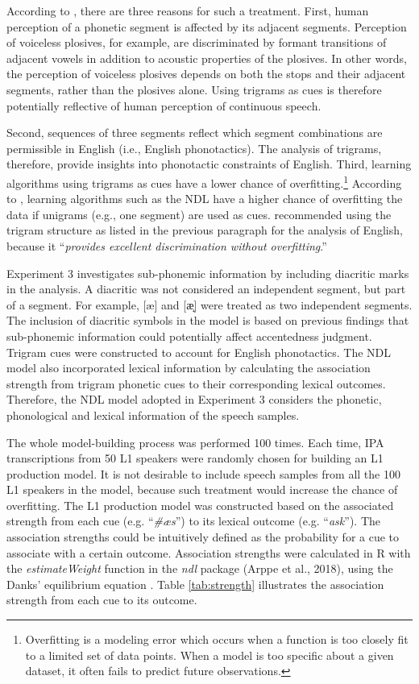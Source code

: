 According to \citet{Baayen_2016}, there are three reasons for such a treatment. First, human perception of a phonetic segment is affected by its adjacent segments. Perception of voiceless plosives, for example, are discriminated by formant transitions of adjacent vowels in addition to acoustic properties of the plosives. In other words, the perception of voiceless plosives depends on both the stops and their adjacent segments, rather than the plosives alone. Using trigrams as cues is therefore potentially reflective of human perception of continuous speech. 

Second, sequences of three segments reflect which segment combinations are permissible in English (i.e., English phonotactics). The analysis of trigrams, therefore, provide insights into phonotactic constraints of English. Third, learning algorithms using trigrams as cues have a lower chance of overfitting.\footnote{Overfitting is a modeling error which occurs when a function is too closely fit to a limited set of data points. When a model is too specific about a given dataset, it often fails to predict future observations.} According to \citet{Baayen_2016}, learning algorithms such as the NDL have a higher chance of overfitting the data if unigrams (e.g., one segment) are used as cues. \citet{Baayen_2016} recommended using the trigram structure as listed in the previous paragraph for the analysis of English, because it “\textit{provides excellent discrimination without overfitting}.” 

Experiment 3 investigates sub-phonemic information by including diacritic marks in the analysis.  A diacritic was not considered an independent segment, but part of a segment. For example, [æ] and [æ̝] were treated as two independent segments. The inclusion of diacritic symbols in the model is based on previous findings that sub-phonemic information could potentially affect accentedness judgment. Trigram cues were constructed to account for English phonotactics. The NDL model also incorporated lexical information by calculating the association strength from trigram phonetic cues to their corresponding lexical outcomes. Therefore, the NDL model adopted in Experiment 3 considers the phonetic, phonological and lexical information of the speech samples.

The whole model-building process was performed 100 times. Each time, IPA transcriptions from 50 L1 speakers were randomly chosen for building an L1 production model. It is not desirable to include speech samples from all the 100 L1 speakers in the model, because such treatment would increase the chance of overfitting. The L1 production model was constructed based on the associated strength from each cue (e.g. “\textit{\#æs}”) to its lexical outcome (e.g. “\textit{ask}”). The association strengths could be intuitively defined as the probability for a cue to associate with a certain outcome. Association strengths were calculated in R with the \textit{estimateWeight} function in the \textit{ndl} package (Arppe et al., 2018), using the Danks’ equilibrium equation \citep{Danks_2003}. Table \ref{tab:strength} illustrates the association strength from each cue to its outcome.

